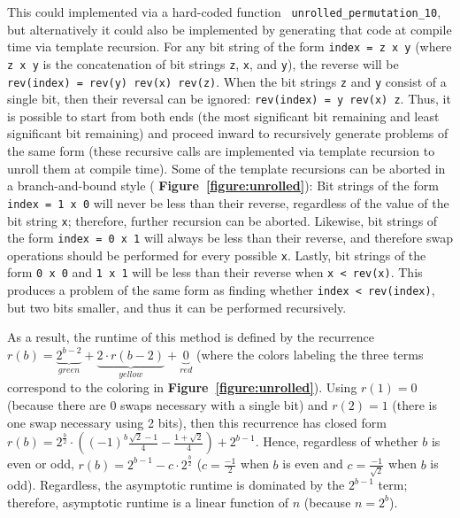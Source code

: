 \documentclass[10pt]{article}
\begin{document}
This could implemented via a hard-coded function {\tt
  unrolled\_permutation\_10}, but alternatively it could also be
implemented by generating that code at compile time via template
recursion. For any bit string of the form {\tt index = z x y} (where
{\tt z x y} is the concatenation of bit strings {\tt z}, {\tt x}, and
{\tt y}), the reverse will be {\tt rev(index) = rev(y) rev(x)
  rev(z)}. When the bit strings {\tt z} and {\tt y} consist of a
single bit, then their reversal can be ignored: {\tt rev(index) = y
  rev(x) z}. Thus, it is possible to start from both ends (the most
significant bit remaining and least significant bit remaining) and
proceed inward to recursively generate problems of the same form
(these recursive calls are implemented via template recursion to
unroll them at compile time). Some of the template recursions can be
aborted in a branch-and-bound style ({\bf
  Figure~\ref{figure:unrolled}}): Bit strings of the form {\tt index =
  1~x~0} will never be less than their reverse, regardless of the
value of the bit string {\tt x}; therefore, further recursion can be
aborted. Likewise, bit strings of the form {\tt index = 0~x~1} will
always be less than their reverse, and therefore swap operations
should be performed for every possible {\tt x}. Lastly, bit strings of
the form {\tt 0~x~0} and {\tt 1~x~1} will be less than their reverse
when {\tt x < rev(x)}. This produces a problem of the same form as
finding whether {\tt index < rev(index)}, but two bits smaller, and
thus it can be performed recursively.

As a result, the runtime of this method is defined by the recurrence
$r(b) = \underbrace{2^{b-2}}_{green} + \underbrace{2 \cdot
  r(b-2)}_{yellow} + \underbrace{0}_{red}$ (where the colors labeling
the three terms correspond to the coloring in {\bf
  Figure~\ref{figure:unrolled}}). Using $r(1) = 0$ (because there are
0 swaps necessary with a single bit) and $r(2) = 1$ (there is one swap
necessary using 2 bits), then this recurrence has closed form $r(b) =
2^{\frac{b}{2}} \cdot \left( {(-1)}^b \frac{\sqrt{2}-1}{4} - \frac{1 +
  \sqrt{2}}{4} \right) + 2^{b-1}$. Hence, regardless of whether $b$ is
even or odd, $r(b) = 2^{b-1} - c \cdot 2^{\frac{b}{2}}$
($c=\frac{-1}{2}$ when $b$ is even and $c=\frac{-1}{\sqrt{2}}$ when
$b$ is odd). Regardless, the asymptotic runtime is dominated by the
$2^{b-1}$ term; therefore, asymptotic runtime is a linear function of
$n$ (because $n = 2^b$).
\end{document}
